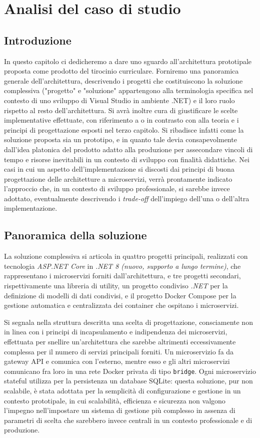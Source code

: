 \chapter{Analisi del caso di studio}
\section{Introduzione}
In questo capitolo ci dedicheremo a dare uno sguardo all'architettura prototipale proposta come prodotto del tirocinio curriculare. Forniremo una panoramica generale dell'architettura, descrivendo i progetti che costituiscono la soluzione complessiva ("progetto" e "soluzione" appartengono alla terminologia specifica nel contesto di uno sviluppo di Visual Studio in ambiente .NET) e il loro ruolo rispetto al resto dell'architettura. Si avrà inoltre cura di giustificare le scelte implementative effettuate, con riferimento a o in contrasto con alla teoria e i principi di progettazione esposti nel terzo capitolo. Si ribadisce infatti come la soluzione proposta sia un prototipo, e in quanto tale devia consapevolmente dall'idea platonica del prodotto adatto alla produzione per assecondare vincoli di tempo e risorse inevitabili in un contesto di sviluppo con finalità didattiche. Nei casi in cui un aspetto dell'implementazione si discosti dai principi di buona progettazione delle architetture a microservizi, verrà prontamente indicato l'approccio che, in un contesto di sviluppo professionale, si sarebbe invece adottato, eventualmente descrivendo i \emph{trade-off} dell'impiego dell'una o dell'altra implementazione.

\section{Panoramica della soluzione}
La soluzione complessiva si articola in quattro progetti principali, realizzati con tecnologia \emph{ASP.NET Core} in \emph{.NET 8 \emph{(nuovo, supporto a lungo termine)}}, che rappresentano i microservizi forniti dall'architettura, e tre progetti secondari, rispettivamente una libreria di utility, un progetto condiviso \emph{.NET} per la definizione di modelli di dati condivisi, e il progetto Docker Compose per la gestione automatica e centralizzata dei container che ospitano i microservizi.

Si segnala nella struttura descritta una scelta di progettazione, consciamente non in linea con i principi di incapsulamento e indipendenza dei microservizi, effettuata per snellire un'architettura che sarebbe altrimenti eccessivamente complessa per il numero di servizi principali forniti. Un microservizio fa da gateway API e comunica con l'esterno, mentre esso e gli altri microservizi comunicano fra loro in una rete Docker privata di tipo \texttt{bridge}. Ogni microservizio stateful utilizza per la persistenza un database SQLite: questa soluzione, pur non scalabile, è stata adottata per la semplicità di configurazione e gestione in un contesto prototipale, in cui scalabilità, efficienza e sicurezza non valgono l'impegno nell'impostare un sistema di gestione più complesso in assenza di parametri di scelta che sarebbero invece centrali in un contesto professionale e di produzione.

